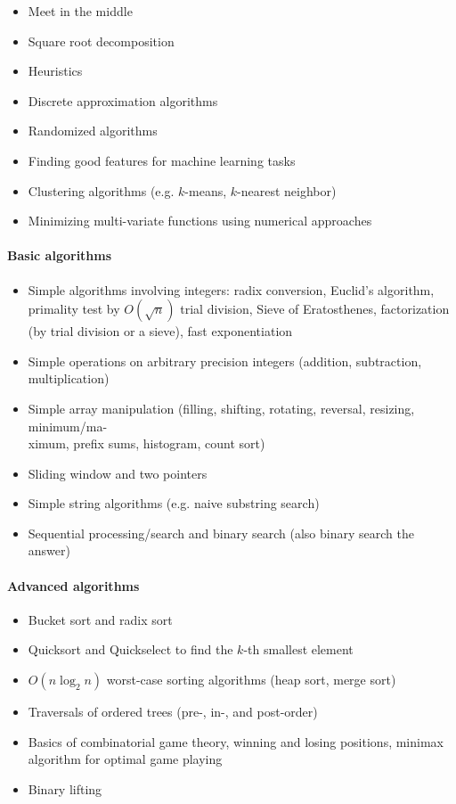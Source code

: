 \documentclass[12pt]{article}
\begin{document}
		\begin{itemize}[label=]
			\item Meet in the middle
			\item Square root decomposition
			\item Heuristics
			\item Discrete approximation algorithms
			\item Randomized algorithms
			\item Finding good features for machine learning tasks
			\item Clustering algorithms (e.g. $k$-means, $k$-nearest neighbor)
			\item Minimizing multi-variate functions using numerical approaches
		\end{itemize}
		
		\paragraph{Basic algorithms}
		\begin{itemize}[label=]
			\item Simple algorithms involving integers: radix conversion, Euclid’s algorithm, primality test by $O(\sqrt{n})$ trial division, Sieve of Eratosthenes, factorization (by trial division or a sieve), fast exponentiation
			\item Simple operations on arbitrary precision integers (addition, subtraction, multiplication)
			\item Simple array manipulation (filling, shifting, rotating, reversal, resizing, minimum/ma-\\ximum, prefix sums, histogram, count sort)
			\item Sliding window and two pointers
			\item Simple string algorithms (e.g. naive substring search)
			\item Sequential processing/search and binary search (also binary search the answer)
		\end{itemize}
	
		\paragraph{Advanced algorithms}
		\begin{itemize}[label=]
			\item Bucket sort and radix sort
			\item Quicksort and Quickselect to find the $k$-th smallest element
			\item $O(n\log_2{n})$ worst-case sorting algorithms (heap sort, merge sort)
			\item Traversals of ordered trees (pre-, in-, and post-order)
			\item Basics of combinatorial game theory, winning and losing positions, minimax algorithm for optimal game playing
			\item Binary lifting
		\end{itemize}
	
\end{document}
